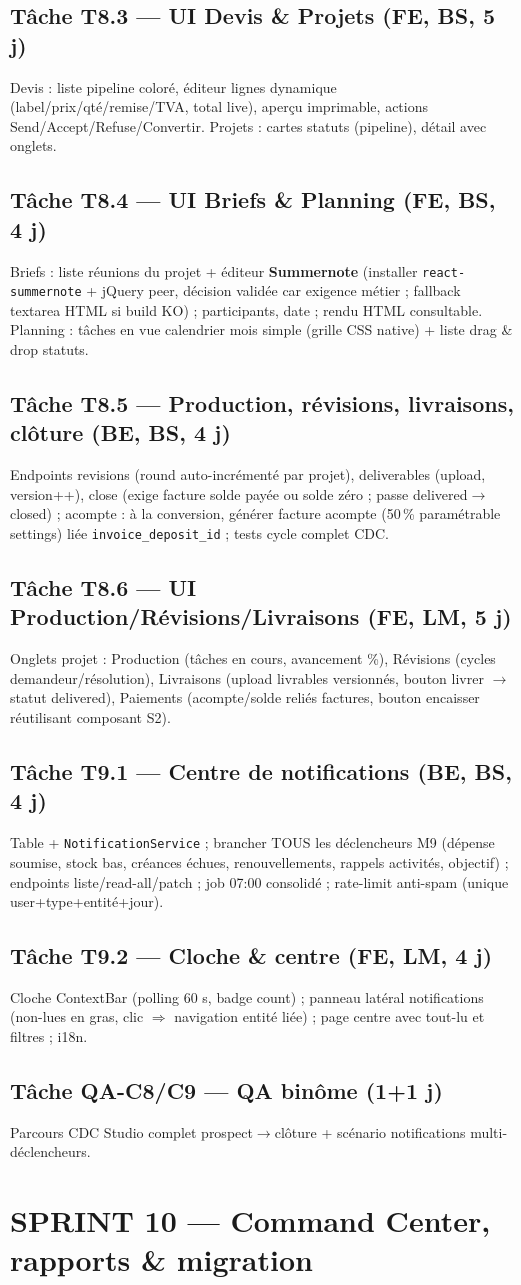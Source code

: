 \documentclass[11pt,a4paper]{article}
\newcommand{\tache}[2]{\subsection{Tâche #1 --- #2}\label{task:#1}}
\begin{document}
\tache{T8.3}{UI Devis \& Projets (FE, BS, 5 j)} Devis : liste pipeline coloré, éditeur lignes dynamique (label/prix/qté/remise/TVA, total live), aperçu imprimable, actions Send/Accept/Refuse/Convertir. Projets : cartes statuts (pipeline), détail avec onglets.

\tache{T8.4}{UI Briefs \& Planning (FE, BS, 4 j)} Briefs : liste réunions du projet + éditeur \textbf{Summernote} (installer \verb|react-summernote| + jQuery peer, décision validée car exigence métier ; fallback textarea HTML si build KO) ; participants, date ; rendu HTML consultable. Planning : tâches en vue calendrier mois simple (grille CSS native) + liste drag \& drop statuts.

\tache{T8.5}{Production, révisions, livraisons, clôture (BE, BS, 4 j)} Endpoints revisions (round auto-incrémenté par projet), deliverables (upload, version++), close (exige facture solde payée ou solde zéro ; passe delivered$\rightarrow$closed) ; acompte : à la conversion, générer facture acompte (50\,\% paramétrable settings) liée \verb|invoice_deposit_id| ; tests cycle complet CDC.

\tache{T8.6}{UI Production/Révisions/Livraisons (FE, LM, 5 j)} Onglets projet : Production (tâches en cours, avancement \%), Révisions (cycles demandeur/résolution), Livraisons (upload livrables versionnés, bouton livrer $\rightarrow$ statut delivered), Paiements (acompte/solde reliés factures, bouton encaisser réutilisant composant S2).

\tache{T9.1}{Centre de notifications (BE, BS, 4 j)} Table + \verb|NotificationService| ; brancher TOUS les déclencheurs M9 (dépense soumise, stock bas, créances échues, renouvellements, rappels activités, objectif) ; endpoints liste/read-all/patch ; job 07:00 consolidé ; rate-limit anti-spam (unique user+type+entité+jour).

\tache{T9.2}{Cloche \& centre (FE, LM, 4 j)} Cloche ContextBar (polling 60 s, badge count) ; panneau latéral notifications (non-lues en gras, clic $\Rightarrow$ navigation entité liée) ; page centre avec tout-lu et filtres ; i18n.

\tache{QA-C8/C9}{QA binôme (1+1 j)} Parcours CDC Studio complet prospect$\rightarrow$clôture + scénario notifications multi-déclencheurs.

\section{SPRINT 10 --- Command Center, rapports \& migration}
\end{document}
